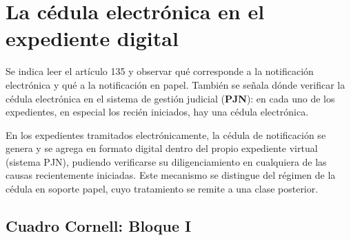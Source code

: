 \documentclass[12pt,oneside]{book}
\begin{document}
\section{La c\'edula electr\'onica en el expediente digital}

Se indica leer el art\'iculo 135 y observar qu\'e corresponde a la notificaci\'on electr\'onica y qu\'e a la notificaci\'on en papel. Tambi\'en se se\~nala d\'onde verificar la c\'edula electr\'onica en el sistema de gesti\'on judicial (\textbf{PJN}): en cada uno de los expedientes, en especial los reci\'en iniciados, hay una c\'edula electr\'onica.

\begin{important}
En los expedientes tramitados electr\'onicamente, la c\'edula de notificaci\'on se genera y se agrega en formato digital dentro del propio expediente virtual (sistema PJN), pudiendo verificarse su diligenciamiento en cualquiera de las causas recientemente iniciadas. Este mecanismo se distingue del r\'egimen de la c\'edula en soporte papel, cuyo tratamiento se remite a una clase posterior.
\end{important}

\subsection*{Cuadro Cornell: Bloque I}
\end{document}

